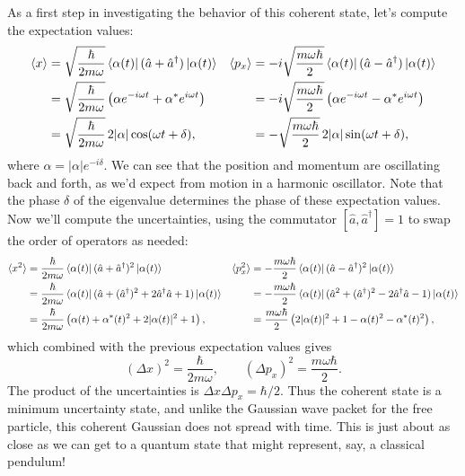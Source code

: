 \documentclass[../p116main.tex]{subfiles}
\begin{document}
As a first step in investigating the behavior of this coherent state, let's compute the expectation values:
\begin{align*}
    \langle x \rangle &= \sqrt{\frac{\hbar}{2m\omega}} \left< \alpha(t) \right| (\hat a + \hat a^\dagger) \left| \alpha(t) \right> & \langle p_x \rangle &= -i\sqrt{\frac{m\omega\hbar}{2}} \left< \alpha(t) \right| (\hat a - \hat a^\dagger) \left| \alpha(t) \right> \\
    &= \sqrt{\frac{\hbar}{2m\omega}} \left( \alpha e^{-i\omega t} + \alpha^* e^{i\omega t} \right) &&= -i\sqrt{\frac{m\omega\hbar}{2}} \left( \alpha e^{-i \omega t} - \alpha^* e^{i\omega t} \right) \\
    &= \sqrt{\frac{\hbar}{2m\omega}} \, 2|\alpha| \cos (\omega t + \delta), &&= -\sqrt{\frac{m\omega\hbar}{2}} \, 2|\alpha| \sin (\omega t + \delta),
\end{align*}
where $\alpha = |\alpha| e^{-i\delta}$.
We can see that the position and momentum are oscillating back and forth, as we'd expect from motion in a harmonic oscillator.
Note that the phase $\delta$ of the eigenvalue determines the phase of these expectation values.
Now we'll compute the uncertainties, using the commutator $[\hat a, \hat a^\dagger] = 1$ to swap the order of operators as needed:
\begin{align*}
    \langle x^2 \rangle &= \frac{\hbar}{2m\omega} \left< \alpha(t) \right| (\hat a + \hat a^\dagger)^2 \left| \alpha(t) \right> & \langle p_x^2 \rangle &= -\frac{m\omega \hbar}{2} \left< \alpha(t) \right| (\hat a - \hat a^\dagger)^2 \left| \alpha(t) \right> \\
    &= \frac{\hbar}{2m\omega} \left< \alpha(t) \right| (\hat a + (\hat a^\dagger)^2 + 2 \hat a^\dagger \hat a + 1) \left| \alpha(t) \right> &&= -\frac{m\omega\hbar}{2} \left< \alpha(t) \right| (\hat a^2 + (\hat a^\dagger)^2 - 2\hat a^\dagger \hat a - 1) \left| \alpha(t) \right> \\
    &= \frac{\hbar}{2m\omega} \left( \alpha(t) + \alpha^*(t)^2 + 2|\alpha(t)|^2 + 1 \right), &&= \frac{m\omega\hbar}{2} \left( 2|\alpha(t)|^2 + 1 - \alpha(t)^2 - \alpha^*(t)^2 \right),
\end{align*}
which combined with the previous expectation values gives
\[ (\Delta x)^2 = \frac{\hbar}{2m\omega}, \qquad (\Delta p_x)^2 = \frac{m\omega\hbar}{2}. \]
The product of the uncertainties is $\Delta x \Delta p_x = \hbar / 2$.
Thus the coherent state is a minimum uncertainty state, and unlike the Gaussian wave packet for the free particle, this coherent Gaussian does not spread with time.
This is just about as close as we can get to a quantum state that might represent, say, a classical pendulum!
\end{document}
